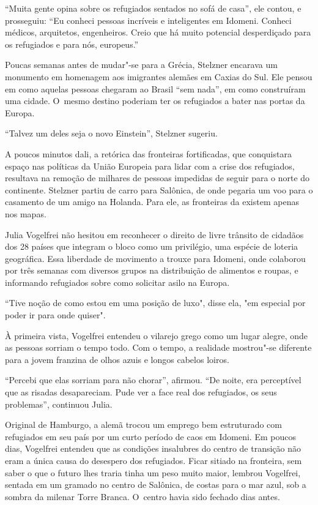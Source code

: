 ``Muita gente opina sobre os refugiados sentados no sofá de casa'',
ele contou, e prosseguiu: ``Eu conheci pessoas incríveis e inteligentes em Idomeni.
Conheci médicos, arquitetos, engenheiros. Creio que há muito potencial
desperdiçado para os refugiados e para nós, europeus.''

Poucas semanas antes de mudar"-se para a Grécia, Stelzner encarava um
monumento em homenagem aos imigrantes alemães em Caxias do Sul. Ele
pensou em como aquelas pessoas chegaram ao Brasil ``sem nada'', em como
construíram uma cidade. O~mesmo destino poderiam ter os refugiados a
bater nas portas da Europa.

``Talvez um deles seja o novo Einstein'', Stelzner sugeriu.

A poucos minutos dali, a retórica das fronteiras fortificadas, que
conquistara espaço nas políticas da União Europeia para lidar com a
crise dos refugiados, resultava na remoção de milhares de pessoas
impedidas de seguir para o norte do continente. Stelzner partiu de
carro para Salônica, de onde pegaria um voo para o casamento de um amigo
na Holanda. Para ele, as fronteiras da  existem apenas nos mapas.

Julia Vogelfrei não hesitou em reconhecer o direito de livre trânsito de
cidadãos dos 28 países que integram o bloco como um privilégio, uma espécie de loteria geográfica. 
Essa liberdade de movimento a trouxe para Idomeni, onde
colaborou por três semanas com diversos grupos na distribuição de
alimentos e roupas, e informando refugiados sobre como solicitar asilo
na Europa.

``Tive noção de como estou em uma posição de luxo", disse ela, "em especial por poder
ir para onde quiser".

À primeira vista, Vogelfrei entendeu o vilarejo grego como um lugar
alegre, onde as pessoas sorriam o tempo todo. Com o tempo, a realidade
mostrou"-se diferente para a jovem franzina de olhos azuis e longos
cabelos loiros.

``Percebi que elas sorriam para não chorar'', afirmou. ``De noite, era
perceptível que as risadas desapareciam. Pude ver a face real dos
refugiados, os seus problemas'', continuou Julia.

Original de Hamburgo, a alemã trocou um emprego bem estruturado com
refugiados em seu país por um curto período de caos em Idomeni. Em
poucos dias, Vogelfrei entendeu que as condições insalubres do centro de
transição não eram a única causa do desespero dos refugiados. Ficar
sitiado na fronteira, sem saber o que o futuro lhes traria tinha um
peso muito maior, lembrou Vogelfrei, sentada em um gramado no centro de
Salônica, de costas para o mar azul, sob a sombra da milenar Torre
Branca. O~centro havia sido fechado dias antes.

